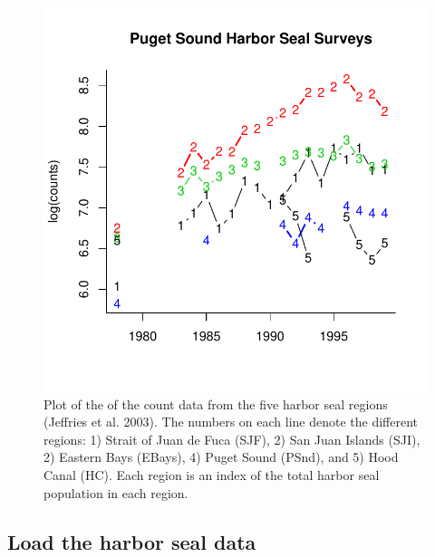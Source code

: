\begin{figure}[htp]
\begin{center}
\includegraphics{./figures/MSS--fig1}
\end{center}
\caption{Plot of the of the count data from the five harbor seal regions (Jeffries et al. 2003). The numbers on each line denote the different regions: 1) Strait of Juan de Fuca (SJF), 2) San Juan Islands (SJI), 2) Eastern Bays (EBays), 4) Puget Sound (PSnd), and 5) Hood Canal (HC).  Each region is an index of the total harbor seal population in each region. }
\label{fig:CS2.fig1}
\end{figure}

\subsection{Load the harbor seal data}

